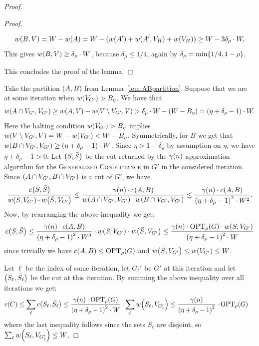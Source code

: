 \begin{proof}
\begin{proof}
\begin{enumerate}
\begin{itemize}
              \[
              w\mathopen{}\left( B, V \right)
              = 
              W-w\mathopen{}\left( A \right)= W-\mathopen{}\left( w\mathopen{}\left( A' \right)+w\mathopen{}\left( A', V_H \right)+w\mathopen{}\left( V_H \right) \right)
              \geq 
                            W-3\delta_{\rho}\cdot W,
              \]
            This gives $w\mathopen{}\left( B, V \right)\geq \delta_{\rho}\cdot W$, because $\delta_{\rho}\leq 1/4$, again by $\delta_{\rho}=\min\mathopen{}\left\{ 1/4,1-\rho \right\}$.
        \end{itemize}
    \end{enumerate}
    This concludes the proof of the lemma.
  \end{proof}
    Take the partition $\mathopen{}\left( A,B \right)$ from Lemma~\ref{lem:ABpartition}.
        Suppose that we are at some iteration when $w\mathopen{}\left( V_{G'} \right)> B_\eta$. We have that
    \[
        w\mathopen{}\left( A\cap V_{G'}, V_{G'} \right)\geq w\mathopen{}\left( A, V \right)-w\mathopen{}\left( V\setminus V_{G'}, V \right)> \delta_{\rho}\cdot W-\mathopen{}\left( W-B_\eta \right)=\mathopen{}\left( \eta+\delta_{\rho}-1 \right)\cdot W.
    \]
        Here the halting condition $w\mathopen{}\left( V_{G'} \right)> B_\eta$ implies $w\mathopen{}\left( V\setminus V_{G'}, V \right)=W-w\mathopen{}\left( V_{G'} \right)<W-B_\eta$.
        Symmetrically, for $B$ we get that $w\mathopen{}\left( B\cap V_{G'}, V_{G'} \right)\geq \mathopen{}\left( \eta+\delta_{\rho}-1 \right)\cdot W$. Since $\eta>1-\delta_{\rho}$ by assumption on $\eta$, we have $\eta+\delta_{\rho}-1>0$. Let $\mathopen{}\left( S, \bar{S} \right)$ be the cut returned by the $\gamma\mathopen{}\left( n \right)$-approximation algorithm for the \textsc{Generalized Conductance} in $G'$ in the considered iteration. Since $\mathopen{}\left( A\cap V_{G'}, B\cap V_{G'} \right)$ is a cut of $G'$, we have
\begin{align*}
        \frac{c\mathopen{}\left( S, \bar{S} \right)}{w\mathopen{}\left( S, V_{G'} \right)\cdot w\mathopen{}\left( \bar{S}, V_{G'} \right)}\leq \frac{\gamma\mathopen{}\left( n \right) \cdot c\mathopen{}\left( A, B \right)}{w\mathopen{}\left( A\cap V_{G'}, V_{G'} \right)\cdot w\mathopen{}\left( B\cap V_{G'}, V_{G'} \right)}
        \leq \frac{\gamma\mathopen{}\left( n \right)\cdot c\mathopen{}\left( A, B \right)}{\mathopen{}\left( \eta+\delta_{\rho}-1 \right)^2\cdot W^2}.
\end{align*}
Now, by rearranging the above inequality we get:
\begin{align*}
        c\mathopen{}\left( S, \bar{S} \right) \leq 
     \frac{\gamma\mathopen{}\left( n \right)\cdot c\mathopen{}\left( A, B \right)}{\mathopen{}\left( \eta+\delta_{\rho}-1 \right)^2\cdot W^2}\cdot w\mathopen{}\left( S, V_{G'} \right)\cdot w\mathopen{}\left( \bar{S}, V_{G'} \right)
     \leq \frac{\gamma\mathopen{}\left( n \right)\cdot \textup{OPT}_{\rho}\mathopen{}\left( G \right)\cdot w\mathopen{}\left( S, V_{G'} \right)}{\mathopen{}\left( \eta+\delta_{\rho}-1 \right)^2\cdot W}
\end{align*}
since trivially we have $c\mathopen{}\left( A, B \right)\leq \textup{OPT}_{\rho}\mathopen{}\left( G \right)$ and $w\mathopen{}\left( \bar{S}, V_{G'} \right)\leq w\mathopen{}\left( V_{G'} \right)\leq W$.

Let $\ell$ be the index of some iteration, let $G_{\ell}'$ be $G'$ at this iteration and let $\mathopen{}\left( S_{\ell}, \bar{S_{\ell}} \right)$ be the cut at this iteration. By summing the above inequality over all iterations we get:
\begin{align*}
    c\mathopen{}\left( C \right) &\leq \sum_{\ell} c\mathopen{}\left( S_{\ell}, \bar{S_{\ell}} \right) \leq \frac{\gamma\mathopen{}\left( n \right)\cdot \textup{OPT}_{\rho}\mathopen{}\left( G \right)}{\mathopen{}\left( \eta+\delta_{\rho}-1 \right)^2\cdot W}\cdot \sum_{\ell} w\mathopen{}\left( S_{\ell}, V_{G'_{\ell}} \right) \leq \frac{\gamma\mathopen{}\left( n \right)}{\mathopen{}\left( \eta+\delta_{\rho}-1 \right)^2}\cdot \textup{OPT}_{\rho}\mathopen{}\left( G \right)
\end{align*}
where the last inequality follows since the sets $S_{\ell}$ are disjoint, so $\sum_{\ell} w\mathopen{}\left( S_{\ell}, V_{G'_{\ell}} \right)\leq W$.
\end{proof}

